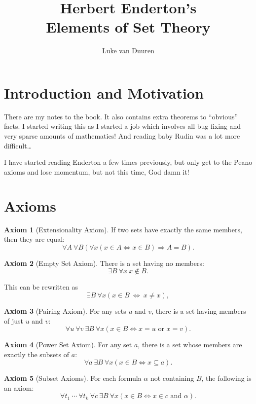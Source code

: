 \documentclass[12pt]{article}
\author{Luke van Duuren}
\title{Herbert Enderton's\\ Elements of Set Theory}
\theoremstyle{plain}
\theoremstyle{remark}
\theoremstyle{definition}
\newtheorem{axiom}{Axiom}[section]
\theoremstyle{remark}
\renewcommand{\iff}{\Leftrightarrow}
\begin{document}
\maketitle

\section{Introduction and Motivation}
There are my notes to the book. It also contains extra theorems to ``obvious'' facts. I started writing this as I started a job which involves all bug fixing and very sparse amounts of mathematics! And reading baby Rudin was a lot more difficult\ldots

I have started reading Enderton a few times previously, but only get to the Peano axioms and lose momentum, but not this time, God damn it!

\section{Axioms}
\begin{axiom}[Extensionality Axiom]\label{extensionality}
 If two sets have exactly the same members, then they are equal:
 \[
  \forall A\ \forall B \left(\forall x(x \in A \Leftrightarrow x \in B) \Rightarrow A = B\right).
 \]
\end{axiom}

\begin{axiom}[Empty Set Axiom] There is a set having no members:
 \[
  \exists B \ \forall x \ x \not\in B.
 \]
\end{axiom}

This can be rewritten as
\[
 \exists B \ \forall x (x \in B\ \iff\ x \neq x),
\]
\begin{axiom}[Pairing Axiom] For any sets $u$ and $v$, there is a set having members of just $u$ and $v$:
 \[
  \forall u\ \forall v\ \exists B\ \forall x(x \in B \Leftrightarrow x = u \text{ or } x = v).
 \]
\end{axiom}

\begin{axiom}[Power Set Axiom] For any set $a$, there is a set whose members are exactly the subsets of $a$:
 \[
  \forall a\ \exists B\ \forall x(x \in B \Leftrightarrow x \subseteq a).
 \]
\end{axiom}

\begin{axiom}[Subset Axioms]
 For each formula $\alpha$ not containing $B$, the following is an axiom:
 \[
  \forall t_1\ \cdots\ \forall t_k\ \forall c\ \exists B\ \forall x(x \in B \Leftrightarrow x \in c \text{ and } \alpha).
 \]
\end{axiom}
\end{document}
